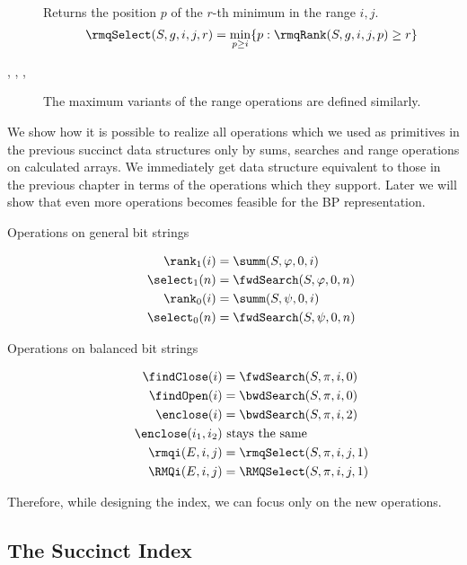 \begin{description}
\begin{description}
		\item[\rmqSelect{}]
		Returns the position $p$ of the $r$-th minimum in the range $i, j$.
		$$\rmqSelect(S, g, i, j, r) = \min_{p \ge i} \{p : \rmqRank(S, g, i, j, p) \ge r\}$$
		
		\item[\RMQ{}, \RMQSize{}, \RMQRank{}, \RMQSelect{}]
		The maximum variants of the range operations are defined similarly.
	\end{description}
\end{description}

\bigbreak

We show how it is possible to realize all operations which we used as primitives in the previous succinct data structures only by sums, searches and range operations on calculated arrays.
We immediately get data structure equivalent to those in the previous chapter in terms of the operations which they support.
Later we will show that even more operations becomes feasible for the BP representation.

\begin{description}
	\item[Operations on general bit strings]
	\begin{align*}
		\rank_1(i) &= \summ(S, \phi, 0, i) \\
		\select_1(n) &= \fwdSearch(S, \phi, 0, n) \\
		\rank_0(i) &= \summ(S, \psi, 0, i) \\
		\select_0(n) &= \fwdSearch(S, \psi, 0, n)
	\end{align*}
	
	\item[Operations on balanced bit strings]
	\begin{align*}
		\findClose(i) &= \fwdSearch(S, \pi, i, 0) \\
		\findOpen(i) &= \bwdSearch(S, \pi, i, 0) \\
		\enclose(i) &= \bwdSearch(S, \pi, i, 2) \\
		\enclose(i_1, i_2)&\ \textrm{stays the same} \\
		\rmqi(E, i, j) &= \rmqSelect(S, \pi, i, j, 1) \\
		\RMQi(E, i, j) &= \RMQSelect(S, \pi, i, j, 1)
	\end{align*}
\end{description}

Therefore, while designing the index, we can focus only on the new operations.

\subsection{The Succinct Index}


